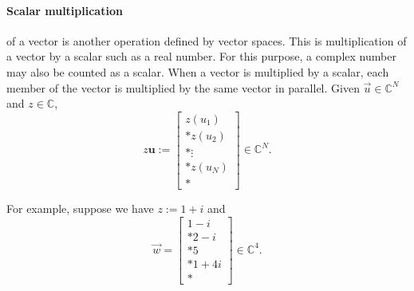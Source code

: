 \documentclass{article}
\begin{document}
\paragraph{Scalar multiplication}\label{para:scalar multiplication}
of a vector is another operation defined by vector spaces.
This is multiplication of a vector by a scalar such as a real number. For this purpose, a complex number may also be counted as a scalar. When a vector is multiplied by a scalar, each member of the vector is multiplied by the same vector in parallel. Given $\vec{u} \in \mathbb{C}^N$ and $z \in \mathbb{C}$,
\begin{equation}
    z\mathbf{u} := \left[
        \begin{matrix}
            z(u_1) \\*
            z(u_2) \\*
            \vdots \\*
            z(u_N) \\*
        \end{matrix}
    \right] \in \mathbb{C}^N.
\end{equation}

For example, suppose we have $z := 1 + i$ and
\begin{equation}
    \vec{w} = \left[
        \begin{matrix}
            1 - i \\*
            2 - i \\*
            5 \\*
            1 + 4i \\*
        \end{matrix}
    \right] \in \mathbb{C}^4.
\end{equation}
\end{document}
